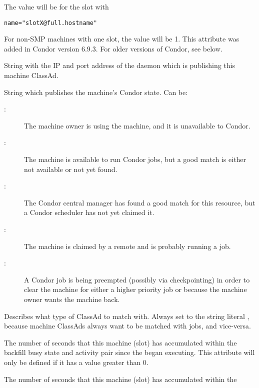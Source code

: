 \begin{description}
The value will be \verb@X@ for the slot with 
\begin{verbatim}
name="slotX@full.hostname"
\end{verbatim}
For non-SMP machines with one slot, the value will be 1.
\Note This attribute was added in Condor version 6.9.3.
For older versions of Condor, see  below.
%
\item[\AdAttr{StartdIpAddr}:] String with the IP and port address of the
 daemon which is publishing this machine ClassAd.
%
\item[\AdAttr{State}:] String which publishes the machine's Condor state.
Can be:
	\begin{description}
	\item[:] The machine owner is using the machine, and
it is unavailable to Condor.
	\item[:] The machine is available to run Condor jobs,
but a good match is either not available or not 
yet found.
	\item[:] The Condor central manager has found a good
match for this resource, but a Condor scheduler has not yet claimed it.
	\item[:] The machine is claimed by a remote
 and is probably running a job.
	\item[:] A Condor job is being preempted (possibly
via checkpointing) in order to clear the machine for either a higher
priority job or because the machine owner wants the machine back.
	\end{description}   %
%
\item[\AdAttr{TargetType}:] Describes what type of ClassAd to match with.
Always set to the string literal , because machine ClassAds
always want to be matched with jobs, and vice-versa.
%
\item[\AdAttr{TotalTimeBackfillBusy}:] The number of seconds
that this machine (slot) has accumulated within the
backfill busy state and activity pair since the 
began executing.
This attribute will only be defined if it has a value greater than 0.
%
\item[\AdAttr{TotalTimeBackfillIdle}:] The number of seconds
that this machine (slot) has accumulated within the

\end{description}
